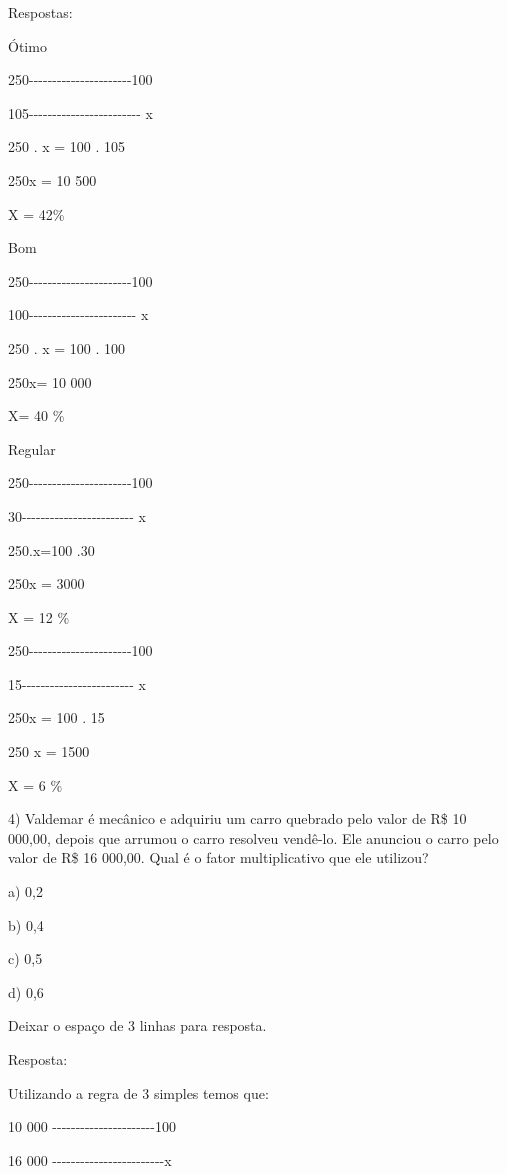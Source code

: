 Respostas:

Ótimo

250-\/-\/-\/-\/-\/-\/-\/-\/-\/-\/-\/-\/-\/-\/-\/-\/-\/-\/-\/-\/-\/-100

105-\/-\/-\/-\/-\/-\/-\/-\/-\/-\/-\/-\/-\/-\/-\/-\/-\/-\/-\/-\/-\/-\/-\/-
x

250 . x = 100 . 105

250x = 10 500

X = 42\%

Bom

250-\/-\/-\/-\/-\/-\/-\/-\/-\/-\/-\/-\/-\/-\/-\/-\/-\/-\/-\/-\/-\/-100

100-\/-\/-\/-\/-\/-\/-\/-\/-\/-\/-\/-\/-\/-\/-\/-\/-\/-\/-\/-\/-\/-\/- x

250 . x = 100 . 100

250x= 10 000

X= 40 \%

Regular

250-\/-\/-\/-\/-\/-\/-\/-\/-\/-\/-\/-\/-\/-\/-\/-\/-\/-\/-\/-\/-\/-100

30-\/-\/-\/-\/-\/-\/-\/-\/-\/-\/-\/-\/-\/-\/-\/-\/-\/-\/-\/-\/-\/-\/-\/-
x

250.x=100 .30

250x = 3000

X = 12 \%

250-\/-\/-\/-\/-\/-\/-\/-\/-\/-\/-\/-\/-\/-\/-\/-\/-\/-\/-\/-\/-\/-100

15-\/-\/-\/-\/-\/-\/-\/-\/-\/-\/-\/-\/-\/-\/-\/-\/-\/-\/-\/-\/-\/-\/-\/-
x

250x = 100 . 15

250 x = 1500

X = 6 \%

4) Valdemar é mecânico e adquiriu um carro quebrado pelo valor de R\$ 10
000,00, depois que arrumou o carro resolveu vendê-lo. Ele anunciou o
carro pelo valor de R\$ 16 000,00. Qual é o fator multiplicativo que ele
utilizou?

a) 0,2

b) 0,4

c) 0,5

d) 0,6

Deixar o espaço de 3 linhas para resposta.

Resposta:

Utilizando a regra de 3 simples temos que:

10 000
-\/-\/-\/-\/-\/-\/-\/-\/-\/-\/-\/-\/-\/-\/-\/-\/-\/-\/-\/-\/-\/-100

16 000
-\/-\/-\/-\/-\/-\/-\/-\/-\/-\/-\/-\/-\/-\/-\/-\/-\/-\/-\/-\/-\/-\/-\/-x


